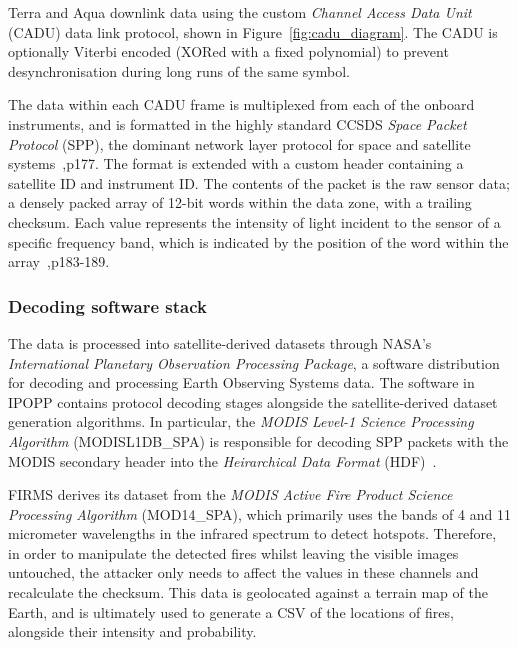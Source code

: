Terra and Aqua downlink data using the custom \textit{Channel Access Data Unit} (CADU) data link protocol, shown in Figure~\ref{fig:cadu_diagram}.
The CADU is optionally Viterbi encoded (XORed with a fixed polynomial) to prevent desynchronisation during long runs of the same symbol.

The data within each CADU frame is multiplexed from each of the onboard instruments, and is formatted in the highly standard CCSDS \textit{Space Packet Protocol} (SPP), the dominant network layer protocol for space and satellite systems~\cite{modisDescription},p177.
The format is extended with a custom header containing a satellite ID and instrument ID.
The contents of the packet is the raw sensor data; a densely packed array of 12-bit words within the data zone, with a trailing checksum.
Each value represents the intensity of light incident to the sensor of a specific frequency band, which is indicated by the position of the word within the array~\cite{modisDescription},p183-189.

\subsubsection{Decoding software stack}

The data is processed into satellite-derived datasets through NASA's \textit{International Planetary Observation Processing Package}, a software distribution for decoding and processing Earth Observing Systems data.
The software in IPOPP contains protocol decoding stages alongside the satellite-derived dataset generation algorithms.
In particular, the \textit{MODIS Level-1 Science Processing Algorithm} (MODISL1DB\_SPA) is responsible for decoding SPP packets with the MODIS secondary header into the \textit{Heirarchical Data Format} (HDF)~\cite{modisL1DB}.


FIRMS derives its dataset from the \textit{MODIS Active Fire Product Science Processing Algorithm} (MOD14\_SPA), which primarily uses the bands of 4 and 11 micrometer wavelengths in the infrared spectrum to detect hotspots.
Therefore, in order to manipulate the detected fires whilst leaving the visible images untouched, the attacker only needs to affect the values in these channels and recalculate the checksum.
This data is geolocated against a terrain map of the Earth, and is ultimately used to generate a CSV of the locations of fires, alongside their intensity and probability.

